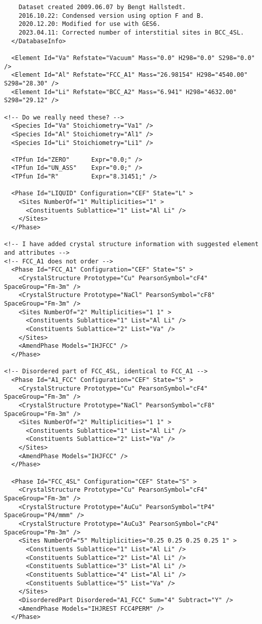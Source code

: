 \documentclass{article}
\begin{document}
\begin{appendices}
\begin{verbatim}
    Dataset created 2009.06.07 by Bengt Hallstedt.
    2016.10.22: Condensed version using option F and B.
    2020.12.20: Modified for use with GES6.
    2023.04.11: Corrected number of interstitial sites in BCC_4SL.
  </DatabaseInfo>

  <Element Id="Va" Refstate="Vacuum" Mass="0.0" H298="0.0" S298="0.0" />
  <Element Id="Al" Refstate="FCC_A1" Mass="26.98154" H298="4540.00" S298="28.30" />
  <Element Id="Li" Refstate="BCC_A2" Mass="6.941" H298="4632.00" S298="29.12" />

<!-- Do we really need these? -->
  <Species Id="Va" Stoichiometry="Va1" />
  <Species Id="Al" Stoichiometry="Al1" />
  <Species Id="Li" Stoichiometry="Li1" />

  <TPfun Id="ZERO"      Expr="0.0;" />
  <TPfun Id="UN_ASS"    Expr="0.0;" />
  <TPfun Id="R"         Expr="8.31451;" />

  <Phase Id="LIQUID" Configuration="CEF" State="L" >
    <Sites NumberOf="1" Multiplicities="1" >
      <Constituents Sublattice="1" List="Al Li" />
    </Sites>
  </Phase>

<!-- I have added crystal structure information with suggested element and attributes -->
<!-- FCC_A1 does not order -->
  <Phase Id="FCC_A1" Configuration="CEF" State="S" >
	<CrystalStructure Prototype="Cu" PearsonSymbol="cF4" SpaceGroup="Fm-3m" />
	<CrystalStructure Prototype="NaCl" PearsonSymbol="cF8" SpaceGroup="Fm-3m" />
    <Sites NumberOf="2" Multiplicities="1 1" >
      <Constituents Sublattice="1" List="Al Li" />
      <Constituents Sublattice="2" List="Va" />
    </Sites>
    <AmendPhase Models="IHJFCC" />
  </Phase>

<!-- Disordered part of FCC_4SL, identical to FCC_A1 -->
  <Phase Id="A1_FCC" Configuration="CEF" State="S" >
	<CrystalStructure Prototype="Cu" PearsonSymbol="cF4" SpaceGroup="Fm-3m" />
	<CrystalStructure Prototype="NaCl" PearsonSymbol="cF8" SpaceGroup="Fm-3m" />
    <Sites NumberOf="2" Multiplicities="1 1" >
      <Constituents Sublattice="1" List="Al Li" />
      <Constituents Sublattice="2" List="Va" />
    </Sites>
    <AmendPhase Models="IHJFCC" />
  </Phase>

  <Phase Id="FCC_4SL" Configuration="CEF" State="S" >
	<CrystalStructure Prototype="Cu" PearsonSymbol="cF4" SpaceGroup="Fm-3m" />
	<CrystalStructure Prototype="AuCu" PearsonSymbol="tP4" SpaceGroup="P4/mmm" />
	<CrystalStructure Prototype="AuCu3" PearsonSymbol="cP4" SpaceGroup="Pm-3m" />
    <Sites NumberOf="5" Multiplicities="0.25 0.25 0.25 0.25 1" >
      <Constituents Sublattice="1" List="Al Li" />
      <Constituents Sublattice="2" List="Al Li" />
      <Constituents Sublattice="3" List="Al Li" />
      <Constituents Sublattice="4" List="Al Li" />
      <Constituents Sublattice="5" List="Va" />
    </Sites>
    <DisorderedPart Disordered="A1_FCC" Sum="4" Subtract="Y" />
    <AmendPhase Models="IHJREST FCC4PERM" />
  </Phase>


\end{verbatim}
\end{appendices}
\end{document}
